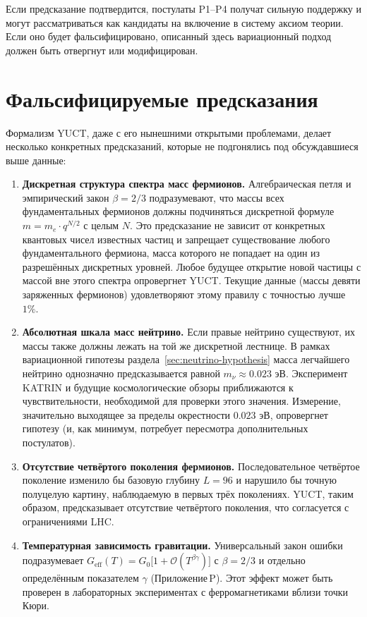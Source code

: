 \documentclass[11pt,a4paper]{article}
\begin{document}
	Если предсказание подтвердится, постулаты P1--P4 получат сильную поддержку и могут рассматриваться как кандидаты на включение в систему аксиом теории.  Если оно будет фальсифицировано, описанный здесь вариационный подход должен быть отвергнут или модифицирован.
	
	\section{Фальсифицируемые предсказания}
	
	Формализм YUCT, даже с его нынешними открытыми проблемами, делает несколько конкретных предсказаний, которые не подгонялись под обсуждавшиеся выше данные:
	
	\begin{enumerate}[label=(\arabic*)]
		\item \textbf{Дискретная структура спектра масс фермионов.}  Алгебраическая петля и эмпирический закон \(\beta = 2/3\) подразумевают, что массы всех фундаментальных фермионов должны подчиняться дискретной формуле \(m = m_e \cdot q^{N/2}\) с целым \(N\).  Это предсказание не зависит от конкретных квантовых чисел известных частиц и запрещает существование любого фундаментального фермиона, масса которого не попадает на один из разрешённых дискретных уровней.  Любое будущее открытие новой частицы с массой вне этого спектра опровергнет YUCT.  Текущие данные (массы девяти заряженных фермионов) удовлетворяют этому правилу с точностью лучше \(1\%\).
		\item \textbf{Абсолютная шкала масс нейтрино.}  Если правые нейтрино существуют, их массы также должны лежать на той же дискретной лестнице.  В рамках вариационной гипотезы раздела~\ref{sec:neutrino-hypothesis} масса легчайшего нейтрино однозначно предсказывается равной \(m_{\nu} \approx 0.023\) эВ.  Эксперимент KATRIN и будущие космологические обзоры приближаются к чувствительности, необходимой для проверки этого значения.  Измерение, значительно выходящее за пределы окрестности \(0.023\) эВ, опровергнет гипотезу (и, как минимум, потребует пересмотра дополнительных постулатов).
		\item \textbf{Отсутствие четвёртого поколения фермионов.}  Последовательное четвёртое поколение изменило бы базовую глубину \(L = 96\) и нарушило бы точную полуцелую картину, наблюдаемую в первых трёх поколениях.  YUCT, таким образом, предсказывает отсутствие четвёртого поколения, что согласуется с ограничениями LHC.
		\item \textbf{Температурная зависимость гравитации.}  Универсальный закон ошибки подразумевает \(G_{\mathrm{eff}}(T) = G_0\bigl[1 + \mathcal{O}(T^{\beta\gamma})\bigr]\) с \(\beta = 2/3\) и отдельно определённым показателем \(\gamma\) (Приложение P).  Этот эффект может быть проверен в лабораторных экспериментах с ферромагнетиками вблизи точки Кюри.

\end{enumerate}
\end{document}
